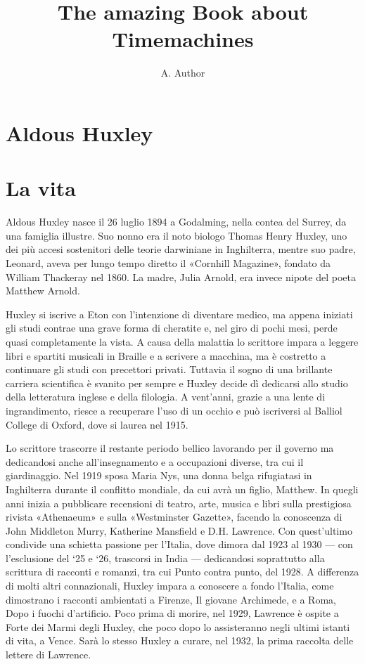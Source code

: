 \documentclass[
a5paper, %
10pt, %
twoside, 
onecolumn, %
openany, %
]{memoir}
\author{A. Author}
\title{The amazing Book about Timemachines}
\begin{document}
\frontmatter

\maketitle

\chapter*{Aldous Huxley}

\chapter*{La vita}

Aldous Huxley nasce il 26 luglio 1894 a Godalming, nella contea del Surrey, da una famiglia illustre. Suo nonno era il noto biologo Thomas Henry Huxley, uno dei più accesi sostenitori delle teorie darwiniane in Inghilterra, mentre suo padre, Leonard, aveva per lungo tempo diretto il «Cornhill Magazine», fondato da William Thackeray nel 1860. La madre, Julia Arnold, era invece nipote del poeta Matthew Arnold.

Huxley si iscrive a Eton con l’intenzione di diventare medico, ma appena iniziati gli studi contrae una grave forma di cheratite e, nel giro di pochi mesi, perde quasi completamente la vista. A causa della malattia lo scrittore impara a leggere libri e spartiti musicali in Braille e a scrivere a macchina, ma è costretto a continuare gli studi con precettori privati. Tuttavia il sogno di una brillante carriera scientifica è svanito per sempre e Huxley decide dì dedicarsi allo studio della letteratura inglese e della filologia. A vent’anni, grazie a una lente di ingrandimento, riesce a recuperare l’uso di un occhio e può iscriversi al Balliol College di Oxford, dove si laurea nel 1915.

Lo scrittore trascorre il restante periodo bellico lavorando per il governo ma dedicandosi anche all’insegnamento e a occupazioni diverse, tra cui il giardinaggio. Nel 1919 sposa Maria Nys, una donna belga rifugiatasi in Inghilterra durante il conflitto mondiale, da cui avrà un figlio, Matthew. In quegli anni inizia a pubblicare recensioni di teatro, arte, musica e libri sulla prestigiosa rivista «Athenaeum» e sulla «Westminster Gazette», facendo la conoscenza di John Middleton Murry, Katherine Mansfield e D.H. Lawrence. Con quest’ultimo condivide una schietta passione per l’Italia, dove dimora dal 1923 al 1930 — con l’esclusione del ‘25 e ‘26, trascorsi in India — dedicandosi soprattutto alla scrittura di racconti e romanzi, tra cui Punto contra punto, del 1928. A differenza di molti altri connazionali, Huxley impara a conoscere a fondo l’Italia, come dimostrano i racconti ambientati a Firenze, Il giovane Archimede, e a Roma, Dopo i fuochi d’artificio. Poco prima di morire, nel 1929, Lawrence è ospite a Forte dei Marmi degli Huxley, che poco dopo lo assisteranno negli ultimi istanti di vita, a Vence. Sarà lo stesso Huxley a curare, nel 1932, la prima raccolta delle lettere di Lawrence.
\end{document}
